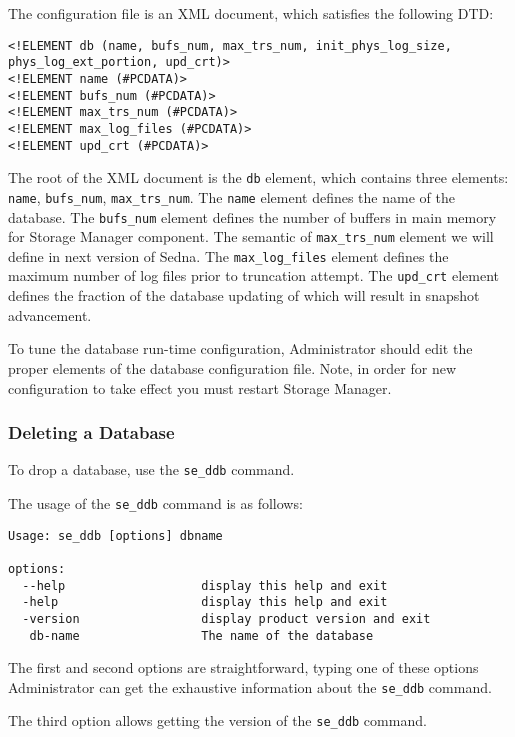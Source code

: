 \documentclass[a4paper,12pt]{article}
\begin{document}
The configuration file is an XML document, which satisfies the following DTD:

\begin{verbatim}
<!ELEMENT db (name, bufs_num, max_trs_num, init_phys_log_size, phys_log_ext_portion, upd_crt)>
<!ELEMENT name (#PCDATA)>
<!ELEMENT bufs_num (#PCDATA)>
<!ELEMENT max_trs_num (#PCDATA)>
<!ELEMENT max_log_files (#PCDATA)>
<!ELEMENT upd_crt (#PCDATA)>
\end{verbatim}

The root of the XML document is the \verb!db! element, which contains three elements: \verb!name!, \verb!bufs_num!, \verb!max_trs_num!. The \verb!name! element defines the name of the database. The \verb!bufs_num! element defines the number of buffers in main memory for Storage Manager component. The semantic of \verb!max_trs_num! element we will define in next version of Sedna. The \verb!max_log_files! element defines the maximum number of log files prior to truncation attempt. The \verb!upd_crt! element defines the fraction of the database updating of which will result in snapshot advancement.

To tune the database run-time configuration, Administrator should edit the proper elements of the database configuration file. Note, in order for new configuration to take effect you must restart Storage Manager.

\subsubsection{Deleting a Database}

To drop a database, use the \verb!se_ddb! command.

The usage of the \verb!se_ddb! command is as follows:

\begin{verbatim}
Usage: se_ddb [options] dbname

options:
  --help                   display this help and exit
  -help                    display this help and exit
  -version                 display product version and exit
   db-name                 The name of the database
\end{verbatim}

The first and second options are straightforward, typing one of these options Administrator can get the exhaustive information about the \verb!se_ddb! command.

The third option allows getting the version of the \verb!se_ddb! command.
\end{document}

